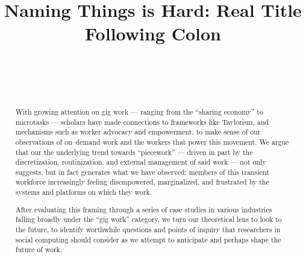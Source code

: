 \documentclass{sigchi}
\def\plaintitle{Naming Things is Hard: Real Title Following Colon}
\begin{document}
\title{\plaintitle}

\author{%
  \\
  \\
  \\
}

\maketitle

\begin{abstract}
  With growing attention on gig work
  --- ranging from the ``sharing economy'' to microtasks ---
  scholars have made connections to frameworks like Taylorism,
  and mechanisms such as worker advocacy and empowerment,
  to make sense of our observations of
  on--demand work and the workers that power this movement.
  We argue that our the underlying trend towards ``piecework''
  --- driven in part by the discretization,
  routinization,
  and external management of said work ---
  not only suggests, but in fact generates what we have observed:
  members of this transient workforce increasingly feeling
  disempowered,
  marginalized,
  and frustrated by the systems and platforms on which they work.
  
  After evaluating this framing
  through a series of case studies
  in various industries falling broadly under the ``gig work'' category,
  we turn our theoretical lens to look to the future,
  to identify worthwhile questions and
  points of inquiry that researchers in social computing should consider
  as we attempt to anticipate and perhaps shape the future of work.
\end{abstract}

 
\end{document}
